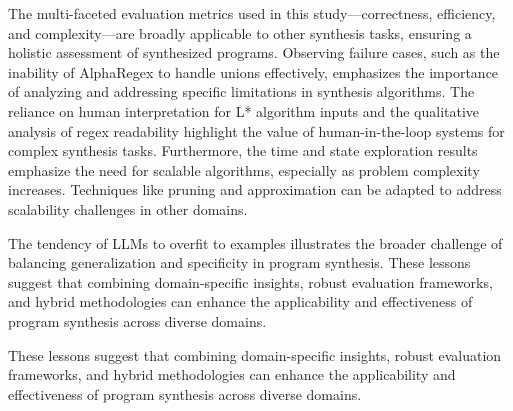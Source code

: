\indent\indent The multi-faceted evaluation metrics used in this study—correctness, efficiency, and complexity—are broadly applicable to other synthesis tasks, ensuring a holistic assessment of synthesized programs. Observing failure cases, such as the inability of AlphaRegex to handle unions effectively, emphasizes the importance of analyzing and addressing specific limitations in synthesis algorithms. The reliance on human interpretation for L* algorithm inputs and the qualitative analysis of regex readability highlight the value of human-in-the-loop systems for complex synthesis tasks. Furthermore, the time and state exploration results emphasize the need for scalable algorithms, especially as problem complexity increases. Techniques like pruning and approximation can be adapted to address scalability challenges in other domains.

\indent\indent The tendency of LLMs to overfit to examples illustrates the broader challenge of balancing generalization and specificity in program synthesis. These lessons suggest that combining domain-specific insights, robust evaluation frameworks, and hybrid methodologies can enhance the applicability and effectiveness of program synthesis across diverse domains.

\indent\indent These lessons suggest that combining domain-specific insights, robust evaluation frameworks, and hybrid methodologies can enhance the applicability and effectiveness of program synthesis across diverse domains.

\vspace{2em}


